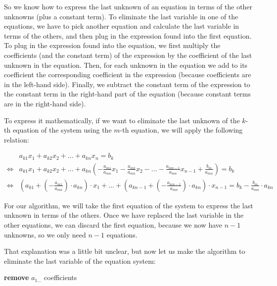 \documentclass[11pt]{article}
\begin{document}
So we know how to express the last unknown of an equation in terms of the other unknowns (plus a constant term).
To eliminate the last variable in one of the equations, we have to pick another equation and calculate the last variable in terms of the others, and then plug in the expression found into the first equation.
To plug in the expression found into the equation, we first multiply the coefficients (and the constant term) of the expression by the coefficient of the last unknown in the equation.
Then, for each unknown in the equation we add to its coefficient the corresponding coefficient in the expression
(because coefficients are in the left-hand side).
Finally, we subtract the constant term of the expression to the constant term in the right-hand part of the equation
(because constant terms are in the right-hand side).

To express it mathematically, if we want to eliminate the last unknown of the $k$-th equation of the system using the $m$-th equation, we will apply the following relation:

\begin{align*}
    &a_{k1} x_1 + a_{k2} x_2 + \dots + a_{kn} x_n = b_k\\
    \iff &a_{k1} x_1 + a_{k2} x_2 + \dots + a_{kn} (-\frac{a_{m1}}{a_{mn}} x_1 - \frac{a_{m2}}{a_{mn}} x_2 - ... - \frac{a_{mn - 1}}{a_{mn}} x_{n - 1} + \frac{b_m}{a_{mn}}) = b_k\\
    \iff &(a_{k1} + (-\frac{a_{m1}}{a_{mn}}) \cdot {a_{kn}}) \cdot x_1 + \dots + (a_{kn - 1} + (-\frac{a_{mn - 1}}{a_{mn}}) \cdot a_{kn}) \cdot x_{n - 1} = b_k - \frac{b_m}{a_{mn}} \cdot a_{kn}
\end{align*}

For our algorithm, we will take the first equation of the system to express the last unknown in terms of the others.
Once we have replaced the last variable in the other equations, we can discard the first equation, because we now have $n - 1$ unknowns, so we only need $n - 1$ equations. 

That explanation was a little bit unclear, but now let us make the algorithm to eliminate the last variable of the equation system:

\begin{algorithm}
\caption{An algorithm to eliminate the last unknown of an linear equation system with non-zero coefficients}


    \BlankLine
    \textbf{remove } $a_{1\dots}$ coefficients\;
\end{algorithm}
\end{document}
